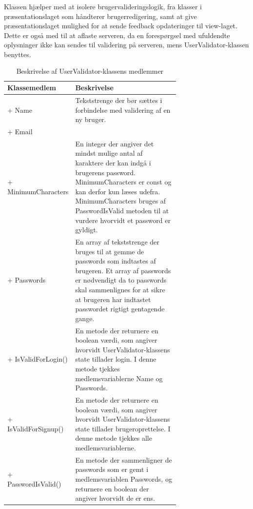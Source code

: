 Klassen hjælper med at isolere brugervalideringslogik, fra klasser i præsentationslaget som håndterer brugerredigering, samt at give præsentationslaget mulighed for at sende feedback opdateringer til view-laget. Dette er også med til at aflaste serveren, da en forespørgsel med ufuldendte oplysninger ikke kan sendes til validering på serveren, mens UserValidator-klassen benyttes.

\begin{table}
	\centering
	\begin{tabular}{| l | p{0.7\linewidth} |}
		\toprule
		\textbf{Klassemedlem}	& \textbf{Beskrivelse} \\
		\midrule
		+ Name				& Tekststrenge der bør sættes i forbindelse med validering af en ny bruger.	\\
		+ Email 			& 	\\\hline
		+ MinimumCharacters  				& En integer der angiver det mindst mulige antal af karaktere der kan indgå i brugerens password. MinimumCharacters er const og kan derfor kun læses udefra. MinimumCharacters bruges af PasswordIsValid metoden til at vurdere hvorvidt et password er gyldigt. \\\hline
		+ Passwords  			& En array af tekststrenge der bruges til at gemme de passwords som indtastes af brugeren. Et array af passwords er nødvendigt da to passwords skal sammenlignes for at sikre at brugeren har indtastet passwordet rigtigt gentagende gange.\\\hline
		+ IsValidForLogin() 				& En metode der returnere en boolean værdi, som angiver hvorvidt UserValidator-klassens state tillader login. I denne metode tjekkes medlemsvariablerne Name og Passwords. \\\hline
		+ IsValidForSignup() 			& En metode der returnere en boolean værdi, som angiver hvorvidt UserValidator-klassens state tillader brugeroprettelse. I denne metode tjekkes alle medlemsvariablerne.
 \\\hline
		+ PasswordIsValid()				& En metode der sammenligner de passwords som er gemt i medlemsvariablen Passwords, og returnere en boolean der angiver hvorvidt de er ens. \\
		\bottomrule
		\end{tabular}
	\caption{Beskrivelse af UserValidator-klassens medlemmer}
	\label{tab:table_design_uservalidator}	
\end{table}